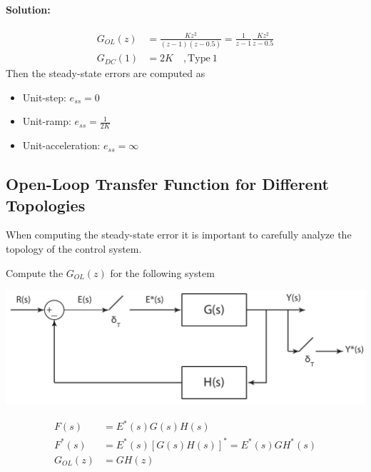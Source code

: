 \documentclass[twoside]{article}
\begin{document}
\paragraph{Solution:} 
%
\begin{align*}
G_{OL}(z) &= \frac{K z^2}{(z-1) (z-0.5)} = \frac{1}{z-1} \frac{K
            z^2}{z - 0.5}
\\
G_{DC}(1) &= 2 K \quad, \mathrm{Type} \ 1 
\end{align*}
%
Then the steady-state errors are computed as
%
\begin{itemize}
\item Unit-step: $e_{ss} = 0$
\item Unit-ramp: $e_{ss} = \frac{1}{2 K}$
\item Unit-acceleration: $e_{ss} = \infty$
\end{itemize}

\subsection*{Open-Loop Transfer Function for Different Topologies}

When computing the steady-state error it is important to 
carefully analyze the topology of the control system. 

Compute the $G_{OL}(z)$ for the following system

\begin{center}
\begin{minipage}[h]{0.6\linewidth}
    \begin{center}
      \includegraphics[width=\textwidth]{closed}
    \end{center}
\end{minipage}
\end{center}

\begin{align*}
F(s) &= E^*(s) G(s) H(s)
\\
F^*(s) &= E^*(s) [ G(s)H(s) ]^* = E^*(s) GH^*(s)
\\
G_{OL}(z) &= GH(z)
\end{align*}
\end{document}
